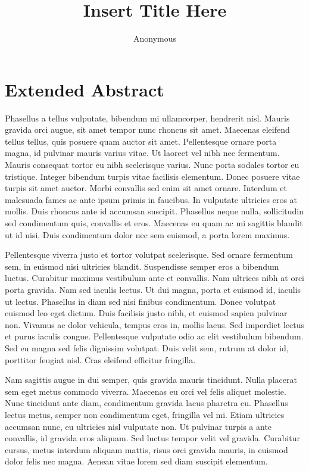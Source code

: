 \documentclass[a4paper,12pt]{article}
\title{Insert Title Here}
\author{Anonymous} %
\date{} %
\begin{document}
\maketitle

\section*{Extended Abstract}
Phasellus a tellus vulputate, bibendum mi ullamcorper, hendrerit nisl. Mauris gravida orci augue, sit amet tempor nunc rhoncus sit amet. Maecenas eleifend tellus tellus, quis posuere quam auctor sit amet. Pellentesque ornare porta magna, id pulvinar mauris varius vitae. Ut laoreet vel nibh nec fermentum. Mauris consequat tortor eu nibh scelerisque varius. Nunc porta sodales tortor eu tristique. Integer bibendum turpis vitae facilisis elementum. Donec posuere vitae turpis sit amet auctor. Morbi convallis sed enim sit amet ornare. Interdum et malesuada fames ac ante ipsum primis in faucibus. In vulputate ultricies eros at mollis. Duis rhoncus ante id accumsan suscipit. Phasellus neque nulla, sollicitudin sed condimentum quis, convallis et eros. Maecenas eu quam ac mi sagittis blandit ut id nisi. Duis condimentum dolor nec sem euismod, a porta lorem maximus. 

Pellentesque viverra justo et tortor volutpat scelerisque. Sed ornare fermentum sem, in euismod nisi ultricies blandit. Suspendisse semper eros a bibendum luctus. Curabitur maximus vestibulum ante et convallis. Nam ultrices nibh at orci porta gravida. Nam sed iaculis lectus. Ut dui magna, porta et euismod id, iaculis ut lectus. Phasellus in diam sed nisi finibus condimentum. Donec volutpat euismod leo eget dictum. Duis facilisis justo nibh, et euismod sapien pulvinar non. Vivamus ac dolor vehicula, tempus eros in, mollis lacus. Sed imperdiet lectus et purus iaculis congue. Pellentesque vulputate odio ac elit vestibulum bibendum. Sed eu magna sed felis dignissim volutpat. Duis velit sem, rutrum at dolor id, porttitor feugiat nisl. Cras eleifend efficitur fringilla. 

Nam sagittis augue in dui semper, quis gravida mauris tincidunt. Nulla placerat sem eget metus commodo viverra. Maecenas eu orci vel felis aliquet molestie. Nunc tincidunt ante diam, condimentum gravida lacus pharetra eu. Phasellus lectus metus, semper non condimentum eget, fringilla vel mi. Etiam ultricies accumsan nunc, eu ultricies nisl vulputate non. Ut pulvinar turpis a ante convallis, id gravida eros aliquam. Sed luctus tempor velit vel gravida. Curabitur cursus, metus interdum aliquam mattis, risus orci gravida mauris, in euismod dolor felis nec magna. Aenean vitae lorem sed diam suscipit elementum. 
\end{document}
